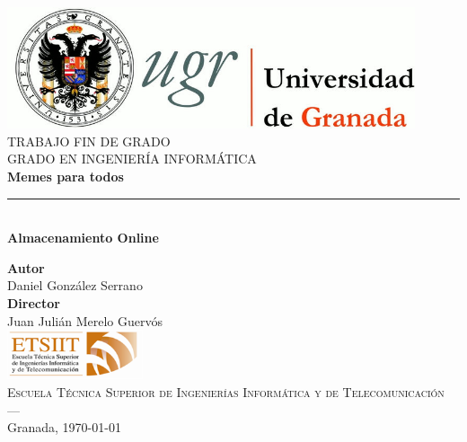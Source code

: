\begin{titlepage}
\newlength{\centeroffset}
\setlength{\centeroffset}{-0.5\oddsidemargin}
\addtolength{\centeroffset}{0.5\evensidemargin}
\thispagestyle{empty}

\noindent\hspace*{\centeroffset}\begin{minipage}{\textwidth}

\centering
\includegraphics[width=0.9\textwidth]{logos/logo_ugr.jpg}\\[1.4cm]

\textsc{ \Large TRABAJO FIN DE GRADO}\\[0.4 cm]
\textsc{ GRADO EN INGENIERÍA INFORMÁTICA}\\[1 cm]

{\Huge\bfseries Memes para todos \\}
\noindent\rule[-1ex]{\textwidth}{3 pt}\\[3.5 ex]
{\large\bfseries Almacenamiento Online }
\end{minipage}

\vspace{2.5cm}
\noindent\hspace*{\centeroffset}
\begin{minipage}{\textwidth}
\centering

\textbf{Autor}\\ {Daniel González Serrano}\\[2.5 ex]
\textbf{Director}\\ {Juan Julián Merelo Guervós}\\[2 cm]
\includegraphics[width=0.3\textwidth]{logos/etsiit_logo.png}\\[0.1 cm]
\textsc{Escuela Técnica Superior de Ingenierías Informática y de Telecomunicación}\\
\textsc{---}\\
Granada, \today

\end{minipage}
\end{titlepage}
